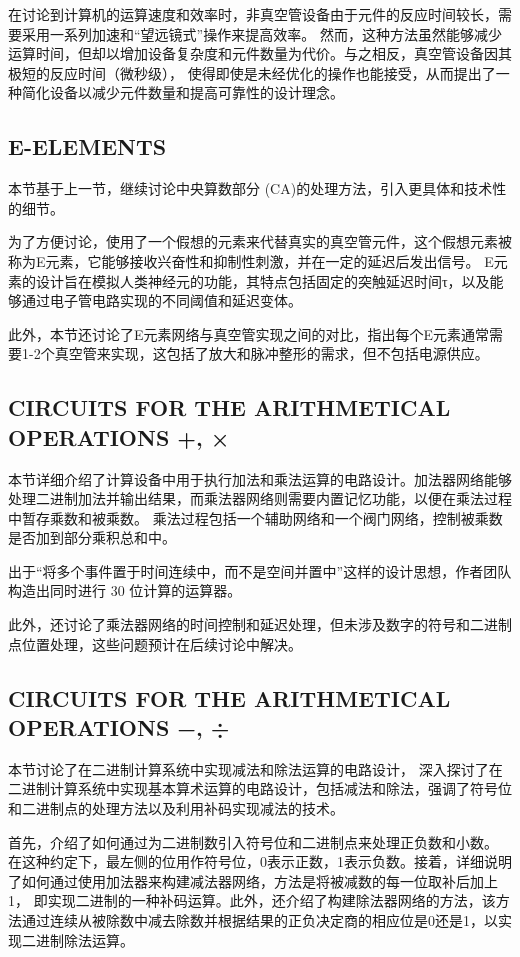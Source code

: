 \documentclass[12pt]{article} %
\theoremstyle{definition}
\begin{document}
在讨论到计算机的运算速度和效率时，非真空管设备由于元件的反应时间较长，需要采用一系列加速和“望远镜式”操作来提高效率。
然而，这种方法虽然能够减少运算时间，但却以增加设备复杂度和元件数量为代价。与之相反，真空管设备因其极短的反应时间（微秒级），
使得即使是未经优化的操作也能接受，从而提出了一种简化设备以减少元件数量和提高可靠性的设计理念。

\subsection{E-ELEMENTS}

本节基于上一节，继续讨论中央算数部分 (CA)的处理方法，引入更具体和技术性的细节。

为了方便讨论，使用了一个假想的元素来代替真实的真空管元件，这个假想元素被称为E元素，它能够接收兴奋性和抑制性刺激，并在一定的延迟后发出信号。
E元素的设计旨在模拟人类神经元的功能，其特点包括固定的突触延迟时间τ，以及能够通过电子管电路实现的不同阈值和延迟变体。

此外，本节还讨论了E元素网络与真空管实现之间的对比，指出每个E元素通常需要1-2个真空管来实现，这包括了放大和脉冲整形的需求，但不包括电源供应。

\subsection{CIRCUITS FOR THE ARITHMETICAL OPERATIONS +, ×}

本节详细介绍了计算设备中用于执行加法和乘法运算的电路设计。加法器网络能够处理二进制加法并输出结果，而乘法器网络则需要内置记忆功能，以便在乘法过程中暂存乘数和被乘数。
乘法过程包括一个辅助网络和一个阀门网络，控制被乘数是否加到部分乘积总和中。

出于“将多个事件置于时间连续中，而不是空间并置中”这样的设计思想，作者团队构造出同时进行 30 位计算的运算器。

此外，还讨论了乘法器网络的时间控制和延迟处理，但未涉及数字的符号和二进制点位置处理，这些问题预计在后续讨论中解决。

\subsection{CIRCUITS FOR THE ARITHMETICAL OPERATIONS −, ÷}

本节讨论了在二进制计算系统中实现减法和除法运算的电路设计，
深入探讨了在二进制计算系统中实现基本算术运算的电路设计，包括减法和除法，强调了符号位和二进制点的处理方法以及利用补码实现减法的技术。

首先，介绍了如何通过为二进制数引入符号位和二进制点来处理正负数和小数。
在这种约定下，最左侧的位用作符号位，0表示正数，1表示负数。接着，详细说明了如何通过使用加法器来构建减法器网络，方法是将被减数的每一位取补后加上1，
即实现二进制的一种补码运算。此外，还介绍了构建除法器网络的方法，该方法通过连续从被除数中减去除数并根据结果的正负决定商的相应位是0还是1，以实现二进制除法运算。
\end{document}
